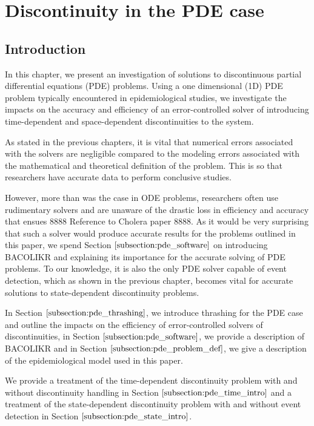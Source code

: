 \documentclass{article}
\begin{document}
\section{Discontinuity in the PDE case}
\subsection{Introduction}
\label{subsection:pde_intro}
In this chapter, we present an investigation of solutions to discontinuous partial differential equations (PDE) problems. Using a one dimensional (1D) PDE problem typically encountered in epidemiological studies, we investigate the impacts on the accuracy and efficiency of an error-controlled solver of introducing time-dependent and space-dependent discontinuities to the system.

As stated in the previous chapters, it is vital that numerical errors associated with the solvers are negligible compared to the modeling errors associated with the mathematical and theoretical definition of the problem. This is so that researchers have accurate data to perform conclusive studies. 

However, more than was the case in ODE problems, researchers often use rudimentary solvers and are unaware of the drastic loss in efficiency and accuracy that ensues 8888 Reference to Cholera paper 8888. As it would be very surprising that such a solver would produce accurate results for the problems outlined in this paper, we spend Section $\ref{subsection:pde_software}$ on introducing BACOLIKR and explaining its importance for the accurate solving of PDE problems. To our knowledge, it is also the only PDE solver capable of event detection, which as shown in the previous chapter, becomes vital for accurate solutions to state-dependent discontinuity problems.

In Section $\ref{subsection:pde_thrashing}$, we introduce thrashing for the PDE case and outline the impacts on the efficiency of error-controlled solvers of discontinuities, in Section $\ref{subsection:pde_software}$, we provide a description of BACOLIKR and in Section $\ref{subsection:pde_problem_def}$, we give a description of the epidemiological model used in this paper.

We provide a treatment of the time-dependent discontinuity problem with and without discontinuity handling in Section $\ref{subsection:pde_time_intro}$ and a treatment of the state-dependent discontinuity problem with and without event detection in Section $\ref{subsection:pde_state_intro}$.
\end{document}
